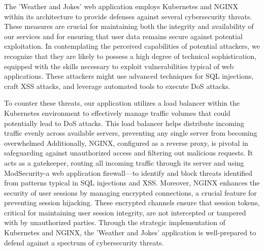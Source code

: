 The 'Weather and Jokes' web application employs Kubernetes and NGINX within its architecture to provide defenses against several cybersecurity threats. 
These measures are crucial for maintaining both the integrity and availability of our services and for ensuring that user data remains secure against potential exploitation.
In contemplating the perceived capabilities of potential attackers, we recognize that they are likely to possess a high degree of technical sophistication, equipped with the skills necessary to exploit vulnerabilities typical of web applications. 
These attackers might use advanced techniques for SQL injections, craft XSS attacks, and leverage automated tools to execute DoS attacks.

To counter these threats, our application utilizes a load balancer within the Kubernetes environment to effectively manage traffic volumes that could potentially lead to DoS attacks. 
This load balancer helps distribute incoming traffic evenly across available servers, preventing any single server from becoming overwhelmed
Additionally, NGINX, configured as a reverse proxy, is pivotal in safeguarding against unauthorized access and filtering out malicious requests. It acts as a gatekeeper, routing all incoming traffic through its server and using ModSecurity-a web application firewall—to identify and block threats identified from patterns typical in SQL injections and XSS. 
Moreover, NGINX enhances the security of user sessions by managing encrypted connections, a crucial feature for preventing session hijacking. 
These encrypted channels ensure that session tokens, critical for maintaining user session integrity, are not intercepted or tampered with by unauthorized parties.
Through the strategic implementation of Kubernetes and NGINX, the 'Weather and Jokes' application is well-prepared to defend against a spectrum of cybersecurity threats.
